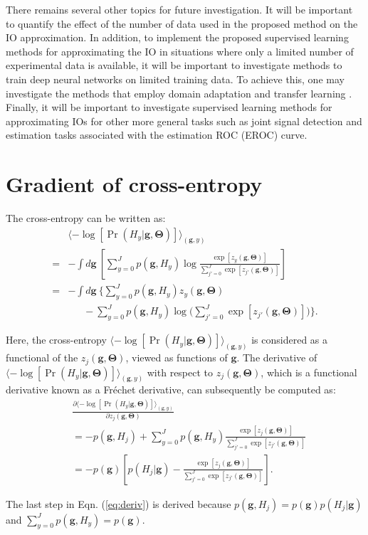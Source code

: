\documentclass[journal]{IEEEtran}
\renewcommand{\vec}[1]{\mathbf{#1}}
\begin{document}
{
There remains several other topics for future investigation.
It will be important to quantify the effect of the number of data used in the proposed method on the IO approximation.
In addition, 
to implement the proposed supervised learning methods for approximating the IO in situations where only a limited number of experimental data is available,
it will be important to investigate methods to train deep neural networks on limited training data. To achieve this, one may investigate the methods that employ domain adaptation\cite{ganin2014unsupervised, he2020learning} and transfer learning \cite{qiu2016survey}.
Finally, it will be important to investigate supervised learning methods for approximating IOs for other 
more general tasks such as joint signal detection and estimation tasks associated with the estimation ROC (EROC) curve.
}

\appendices
\section{Gradient of cross-entropy}
\label{append}
The cross-entropy can be written as:
\begin{equation}
\begin{aligned}
& \langle-\log[\Pr(H_y|\vec{g}, \bm\Theta)]\rangle_{(\vec{g}, y)}\\
 = &-\int d\vec{g}\ \left[\sum_{{y}=0}^{J}p(\vec{g}, H_{{y}})\log{\frac{\exp{[z_{{y}}(\vec{g}, \bm\Theta)]}}{\sum_{j' = 0}^{J}\exp{[z_{j'}(\vec{g}, \bm\Theta)]} }}\right]\\
 = &-\int d\vec{g}\ \Big\{\sum_{{y}=0}^{J}p(\vec{g}, H_{{y}}){z_{{y}}(\vec{g}, \bm\Theta)} \\
 &\ \ \ \ \ \ \ - \sum_{{y}=0}^{J}p(\vec{g}, H_{{y}})\log\big(\sum_{{j'}=0}^{J}\exp{[z_{j'}(\vec{g}, \bm\Theta)]} \big) \Big\}.
 \end{aligned}
 \end{equation}
 
{Here, the cross-entropy $\langle-\log[\Pr(H_y|\vec{g}, \bm\Theta)]\rangle_{(\vec{g}, y)}$
is considered as a functional of the $z_j(\vec{g}, \bm\Theta)$, viewed as functions of $\vec{g}$.
The derivative of $\langle-\log[\Pr(H_y|\vec{g}, \bm\Theta)]\rangle_{(\vec{g}, y)}$ with respect to $z_j(\vec{g}, \bm\Theta)$,
which is a functional derivative known as a Fr\'{e}chet derivative,}
 can subsequently be computed as:
 \begin{equation}\label{eq:deriv}
 \begin{aligned}
 &\frac{\partial \langle-\log[\Pr(H_y|\vec{g}, \bm\Theta)]\rangle_{(\vec{g}, y)}}{\partial z_j(\vec{g}, \bm\Theta)}  \\
 &=-p(\vec{g}, H_j) +\sum_{{y}=0}^{J}p(\vec{g}, H_{{y}})\frac{\exp{[z_{j}(\vec{g}, \bm\Theta)]}}{\sum_{j' = 0}^{J}\exp{[z_{j'}(\vec{g}, \bm\Theta)]} } \\
 &=-p(\vec{g}) \left[p(H_j|\vec{g}) - \frac{\exp{[z_j(\vec{g}, \bm\Theta)]}}{\sum_{j' = 0}^{J}\exp{[z_{j'}(\vec{g}, \bm\Theta)]} } \right].
  \end{aligned}
  \end{equation}
  
 The last step in Eqn. (\ref{eq:deriv}) is derived because $p(\vec{g}, H_j) = p(\vec{g}) p(H_j|\vec{g})$ and $\sum_{{y}=0}^{J}p(\vec{g}, H_{{y}}) = p(\vec{g})$.


{}

\end{document}
